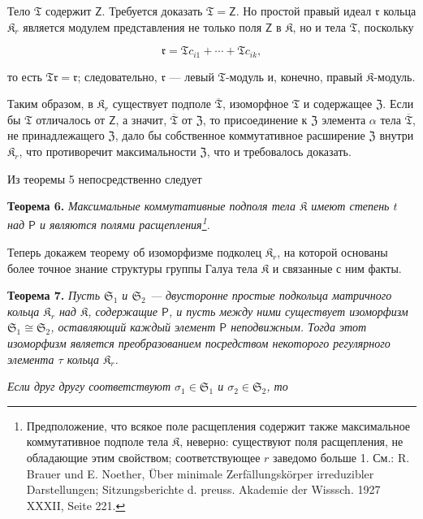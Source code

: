 \documentclass[11pt]{article}
\newcommand{\srcfn}[2]{\footnote{#2}}
\begin{document}
Тело \(\mathfrak T\) содержит \(\mathsf{Z}\). Требуется доказать \(\mathfrak T=\mathsf{Z}\). Но простой правый идеал \(\mathfrak r\) кольца \(\mathfrak K_r\) является модулем представления не только поля \(\mathsf{Z}\) в \(\mathfrak K\), но и тела \(\mathfrak T\), поскольку

\[
\mathfrak r=\mathfrak T c_{i1}+\cdots+\mathfrak T c_{ik},
\]

то есть \(\mathfrak T\mathfrak r=\mathfrak r\); следовательно, \(\mathfrak r\) --- левый \(\mathfrak T\)-модуль и, конечно, правый \(\mathfrak K\)-модуль.

Таким образом, в \(\mathfrak K_r\) существует подполе \(\overline{\mathfrak T}\), изоморфное \(\mathfrak T\) и содержащее \(\mathfrak Z\). Если бы \(\mathfrak T\) отличалось от \(\mathsf{Z}\), а значит, \(\overline{\mathfrak T}\) от \(\mathfrak Z\), то присоединение к \(\mathfrak Z\) элемента \(\alpha\) тела \(\overline{\mathfrak T}\), не принадлежащего \(\mathfrak Z\), дало бы собственное коммутативное расширение \(\mathfrak Z\) внутри \(\mathfrak K_r\), что противоречит максимальности \(\mathfrak Z\), что и требовалось доказать.

Из теоремы 5 непосредственно следует

\textbf{Теорема 6.} \emph{Максимальные коммутативные подполя тела \(\mathfrak K\) имеют степень \(t\) над \(\mathsf P\) и являются полями расщепления\srcfn{1}{Предположение, что всякое поле расщепления содержит также максимальное коммутативное подполе тела \(\mathfrak K\), неверно: существуют поля расщепления, не обладающие этим свойством; соответствующее \(r\) заведомо больше 1. См.: R. Brauer und E. Noether, Über minimale Zerfällungskörper irreduzibler Darstellungen; Sitzungsberichte d. preuss. Akademie der Wisssch. 1927 XXXII, Seite 221.}.}

Теперь докажем теорему об изоморфизме подколец \(\mathfrak K_r\), на которой основаны более точное знание структуры группы Галуа тела \(\mathfrak K\) и связанные с ним факты.

\textbf{Теорема 7.} \emph{Пусть \(\mathfrak S_1\) и \(\mathfrak S_2\) --- двусторонне простые подкольца матричного кольца \(\mathfrak K_r\) над \(\mathfrak K\), содержащие \(\mathsf P\), и пусть между ними существует изоморфизм \(\mathfrak S_1\cong\mathfrak S_2\), оставляющий каждый элемент \(\mathsf P\) неподвижным. Тогда этот изоморфизм является преобразованием посредством некоторого регулярного элемента \(\tau\) кольца \(\mathfrak K_r\).}

\emph{Если друг другу соответствуют \(\sigma_1\in\mathfrak S_1\) и \(\sigma_2\in\mathfrak S_2\), то}
\end{document}
